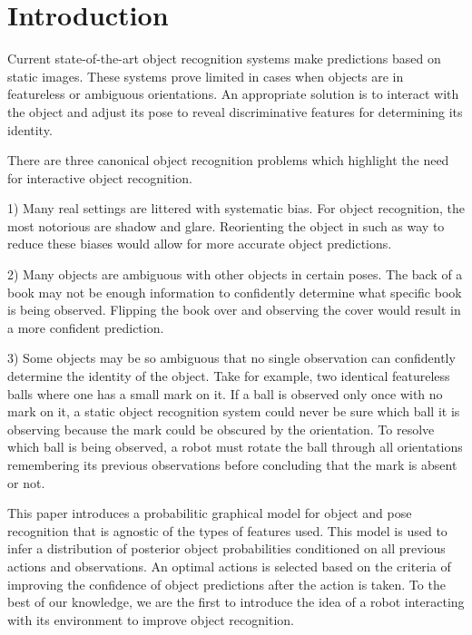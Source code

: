 \section{Introduction}
    \label{sec:intro}


    Current state-of-the-art object recognition systems make predictions based on static images. These systems prove limited in cases when objects are in featureless or ambiguous orientations. An appropriate solution is to interact with the object and adjust its pose to reveal discriminative features for determining its identity.

    There are three canonical object recognition problems which highlight the need for interactive object recognition.

    1) Many real settings are littered with systematic bias. For object recognition, the most notorious are shadow and glare. Reorienting the object in such as way to reduce these biases would allow for more accurate object predictions.

    2) Many objects are ambiguous with other objects in certain poses. The back of a book may not be enough information to confidently determine what specific book is being observed. Flipping the book over and observing the cover would result in a more confident prediction. 

    3) Some objects may be so ambiguous that no single observation can confidently determine the identity of the object. Take for example, two identical featureless balls where one has a small mark on it. If a ball is observed only once with no mark on it, a static object recognition system could never be sure which ball it is observing because the mark could be obscured by the orientation. To resolve which ball is being observed, a robot must rotate the ball through all orientations remembering its previous observations before concluding that the mark is absent or not.

    This paper introduces a probabilitic graphical model for object and pose recognition that is agnostic of the types of  features used. This model is used to infer a distribution of posterior object probabilities conditioned on all previous actions and observations. An optimal actions is selected based on the criteria of improving the confidence of object predictions after the action is taken. To the best of our knowledge, we are the first to introduce the idea of a robot interacting with its environment to improve object recognition. 

